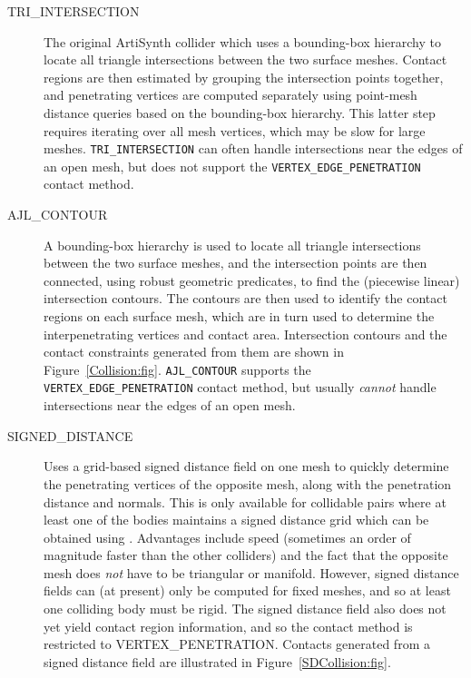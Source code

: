 \begin{description}

\item[TRI\_INTERSECTION]\mbox{}

The original ArtiSynth collider which uses a bounding-box hierarchy to
locate all triangle intersections between the two surface
meshes. Contact regions are then estimated by grouping the
intersection points together, and penetrating vertices are computed
separately using point-mesh distance queries based on the bounding-box
hierarchy. This latter step requires iterating over all mesh vertices,
which may be slow for large meshes. {\tt TRI\_INTERSECTION} can often
handle intersections near the edges of an open mesh, but does not
support the {\tt VERTEX\_EDGE\_PENETRATION} contact method.

\item[AJL\_CONTOUR]\mbox{}

A bounding-box hierarchy is used to locate all triangle intersections
between the two surface meshes, and the intersection points are then
connected, using robust geometric predicates, to find the (piecewise
linear) intersection contours.  The contours are then used to identify
the contact regions on each surface mesh, which are in turn used to
determine the interpenetrating vertices and contact area. Intersection
contours and the contact constraints generated from them are shown in
Figure~\ref{Collision:fig}.  {\tt AJL\_CONTOUR} supports the {\tt
VERTEX\_EDGE\_PENETRATION} contact method, but usually {\it cannot}
handle intersections near the edges of an open mesh.

\item[SIGNED\_DISTANCE]\mbox{}

Uses a grid-based signed distance field on one mesh to quickly
determine the penetrating vertices of the opposite mesh, along with
the penetration distance and normals.  This is only available for
collidable pairs where at least one of the bodies maintains a signed
distance grid which can be obtained using
.
Advantages include speed (sometimes an order of magnitude faster than
the other colliders) and the fact that the opposite mesh does {\it
not} have to be triangular or manifold.  However, signed distance
fields can (at present) only be computed for fixed meshes, and so at
least one colliding body must be rigid.  The signed distance field
also does not yet yield contact region information, and so the
contact method is restricted to
%
{VERTEX\_PENETRATION}.
Contacts generated from a signed distance field are illustrated in
Figure~\ref{SDCollision:fig}.


\end{description}
